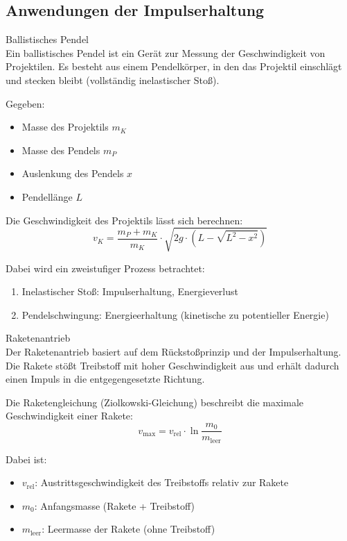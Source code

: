 \subsection{Anwendungen der Impulserhaltung}
\begin{example2}{Ballistisches Pendel}\\
    Ein ballistisches Pendel ist ein Gerät zur Messung der Geschwindigkeit von Projektilen. Es besteht aus einem Pendelkörper, in den das Projektil einschlägt und stecken bleibt (vollständig inelastischer Stoß).
    
    Gegeben:
    \begin{itemize}
        \item Masse des Projektils $m_K$
        \item Masse des Pendels $m_P$
        \item Auslenkung des Pendels $x$
        \item Pendellänge $L$
    \end{itemize}
    
    Die Geschwindigkeit des Projektils lässt sich berechnen:
    \begin{equation}
        v_K = \frac{m_P + m_K}{m_K} \cdot \sqrt{2g \cdot (L - \sqrt{L^2 - x^2})}
    \end{equation}
    
    Dabei wird ein zweistufiger Prozess betrachtet:
    \begin{enumerate}
        \item Inelastischer Stoß: Impulserhaltung, Energieverlust
        \item Pendelschwingung: Energieerhaltung (kinetische zu potentieller Energie)
    \end{enumerate}
\end{example2}

\begin{example2}{Raketenantrieb}\\
    Der Raketenantrieb basiert auf dem Rückstoßprinzip und der Impulserhaltung. Die Rakete stößt Treibstoff mit hoher Geschwindigkeit aus und erhält dadurch einen Impuls in die entgegengesetzte Richtung.
    
    Die Raketengleichung (Ziolkowski-Gleichung) beschreibt die maximale Geschwindigkeit einer Rakete:
    \begin{equation}
        v_{\text{max}} = v_{\text{rel}} \cdot \ln\frac{m_0}{m_{\text{leer}}}
    \end{equation}
    
    Dabei ist:
    \begin{itemize}
        \item $v_{\text{rel}}$: Austrittsgeschwindigkeit des Treibstoffs relativ zur Rakete
        \item $m_0$: Anfangsmasse (Rakete + Treibstoff)
        \item $m_{\text{leer}}$: Leermasse der Rakete (ohne Treibstoff)
    \end{itemize}
\end{example2}

